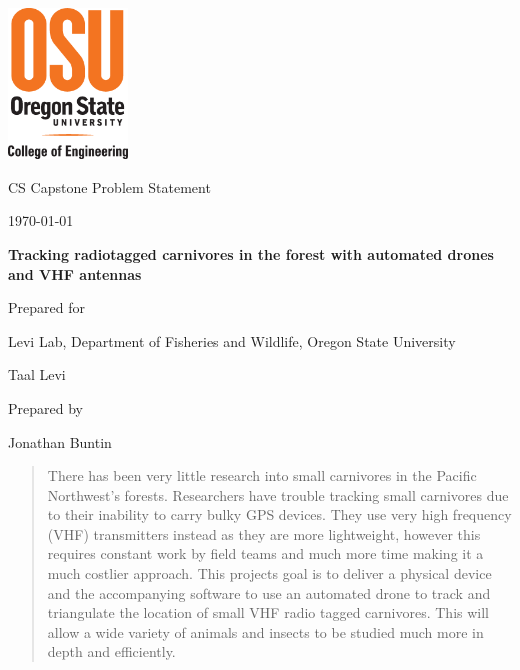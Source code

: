 \documentclass[onecolumn, draftclsnofoot,10pt, compsoc]{IEEEtran}
\def \CapstoneTeamName{         Taal Squad}
\def \CapstoneTeamNumber{		33}
\def \GroupMemberOne{			Jonathan Buntin}
\def \GroupMemberTwo{			Thomas Kuhn}
\def \GroupMemberThree{			Karl Popper}
\def \CapstoneProjectName{		Tracking radiotagged carnivores in the forest with automated drones and VHF antennas}
\def \CapstoneSponsorCompany{	Levi Lab, Department of Fisheries and Wildlife, Oregon State University}
\def \CapstoneSponsorPerson{		Taal Levi}
\def \DocType{		Problem Statement
				}
\newcommand{\NameSigPair}[1]{\par
\makebox[2.75in][r]{#1} \hfil 	\makebox[3.25in]{\makebox[2.25in]{\hrulefill} \hfill		\makebox[.75in]{\hrulefill}}
\par\vspace{-12pt} \textit{\tiny\noindent
\makebox[2.75in]{} \hfil		\makebox[3.25in]{\makebox[2.25in][r]{Signature} \hfill	\makebox[.75in][r]{Date}}}}
\renewcommand{\NameSigPair}[1]{#1}
\begin{document}
\begin{titlepage}
    \begin{singlespace}
    	\includegraphics[height=4cm]{coe_v_spot1}
        \hfill 
        \par\vspace{.2in}
        \centering
        \scshape{
            \huge CS Capstone \DocType \par
            {\large\today}\par
            \vspace{.5in}
            \textbf{\Huge\CapstoneProjectName}\par
            \vfill
            {\large Prepared for}\par
            \Huge \CapstoneSponsorCompany\par
            \vspace{5pt}
            {\Large\NameSigPair{\CapstoneSponsorPerson}\par}
            {\large Prepared by }\par
            \vspace{5pt}
            {\Large
                \NameSigPair{\GroupMemberOne}\par
            }
            \vspace{20pt}
        }
        \begin{abstract}
            There has been very little research into small carnivores in the Pacific Northwest’s forests. Researchers have trouble tracking small carnivores due to their inability to carry bulky GPS devices. They use very high frequency (VHF) transmitters instead as they are more lightweight, however this requires constant work by field teams and much more time making it a much costlier approach. This projects goal is to deliver a physical device and the accompanying software to use an automated drone to track and triangulate the location of small VHF radio tagged carnivores. This will allow a wide variety of animals and insects to be studied much more in depth and efficiently.\par
        \end{abstract}     
    \end{singlespace}
\end{titlepage}
\end{document}
